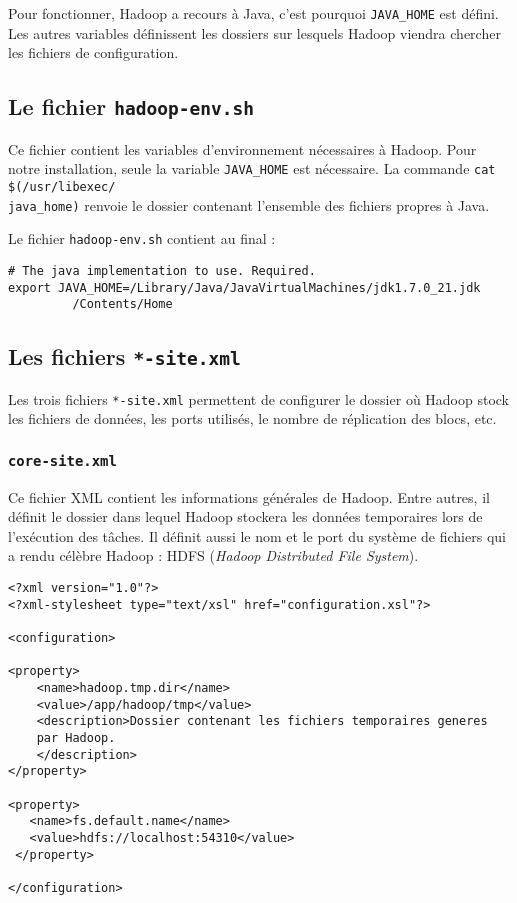 \par Pour fonctionner, Hadoop a recours à Java, c'est pourquoi \texttt{JAVA\_HOME} est défini. Les autres variables définissent les dossiers sur lesquels Hadoop viendra chercher les fichiers de configuration.

\subsection{Le fichier \texttt{hadoop-env.sh}}

\par Ce fichier contient les variables d'environnement nécessaires à Hadoop. Pour notre installation, seule la variable \texttt{JAVA\_HOME} est nécessaire. La commande \texttt{cat} \texttt{\$(/usr/libexec/\\java\_home)} renvoie le dossier contenant l'ensemble des fichiers propres à Java.

\par Le fichier \texttt{hadoop-env.sh} contient au final :

\begin{verbatim}
# The java implementation to use. Required.
export JAVA_HOME=/Library/Java/JavaVirtualMachines/jdk1.7.0_21.jdk
		 /Contents/Home
\end{verbatim}

\subsection{Les fichiers \texttt{*-site.xml}}

\par Les trois fichiers \texttt{*-site.xml} permettent de configurer le dossier où Hadoop stock les fichiers de données, les ports utilisés, le nombre de réplication des blocs, etc.

\subsubsection{\texttt{core-site.xml}}

\par Ce fichier XML contient les informations générales de Hadoop. Entre autres, il définit le dossier dans lequel Hadoop stockera les données temporaires lors de l'exécution des tâches. Il définit aussi le nom et le port du système de fichiers qui a rendu célèbre Hadoop : HDFS (\textit{Hadoop Distributed File System}).

\begin{verbatim}
<?xml version="1.0"?>
<?xml-stylesheet type="text/xsl" href="configuration.xsl"?>

<configuration>

<property>
	<name>hadoop.tmp.dir</name>
	<value>/app/hadoop/tmp</value>
	<description>Dossier contenant les fichiers temporaires generes
	par Hadoop.
	</description>
</property>

<property>
   <name>fs.default.name</name>
   <value>hdfs://localhost:54310</value>
 </property>

</configuration>
\end{verbatim}

